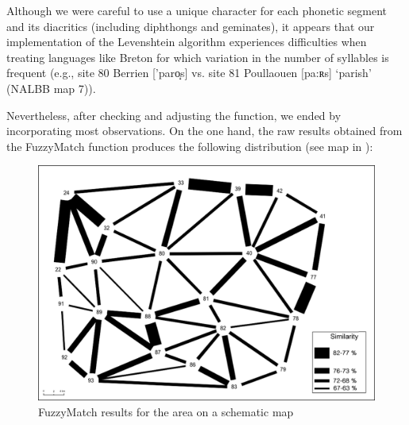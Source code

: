 \documentclass[output=paper]{LSP/langsci}
\begin{document}
\begin{table}
\caption{Examples of the difficulties encountered by LD for the concept 'that one (masc.)'}
\label{tab:brun:3}
\end{table}

Although we were careful to use a unique character for each phonetic segment and its diacritics (including diphthongs and geminates), it appears that our implementation of the Levenshtein algorithm experiences difficulties when treating languages like Breton for which variation in the number of syllables is frequent (e.g., site 80 Berrien ['paro̝s] vs. site 81 Poullaouen [pa:ʀs] ‘parish’ (NALBB map 7)).

Nevertheless, after checking and adjusting the function, we ended by incorporating most observations. On the one hand, the raw results obtained from the FuzzyMatch function produces the following distribution (see map in ):

\begin{figure}
\includegraphics[width=\textwidth]{illustrations/brun_etal_fig3}
\caption{\textup{FuzzyMatch results for the area on a schematic map}}
\label{fig:3}
\end{figure}
\end{document}
